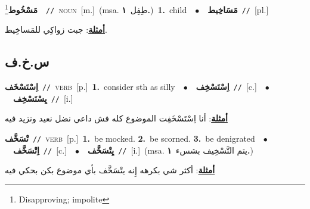 \documentclass[10pt,a4paper,twoside]{article} %
\begin{document}
\begin{multicols}{2}
{\setlength\topsep{0pt}\textbf{\foreignlanguage{arabic}{مَسْخُوط}}\footnote{Disapproving; impolite}\ \ {\color{gray}\texttt{//}\color{black}}\ \textsc{noun}\ [m.]\ \color{gray}(msa. \foreignlanguage{arabic}{طِفِل}~\foreignlanguage{arabic}{\textbf{١.}})\color{black}\ \textbf{1.}~child\ \ $\bullet$\ \ \setlength\topsep{0pt}\textbf{\foreignlanguage{arabic}{مَسَاخِيط}}\ {\color{gray}\texttt{//}\color{black}}\ [pl.]\  \begin{flushright}\color{gray}\foreignlanguage{arabic}{\textbf{\underline{\foreignlanguage{arabic}{أمثلة}}}: جبت زواكِي للمَساخِيط.}\end{flushright}\color{black}} \vspace{2mm}

\vspace{-3mm}
\subsection*{\color{blue}\foreignlanguage{arabic}{س.خ.ف}\color{blue}{}} 

{\setlength\topsep{0pt}\textbf{\foreignlanguage{arabic}{اِسْتَسْخَف}}\ {\color{gray}\texttt{//}\color{black}}\ \textsc{verb}\ [p.]\ \textbf{1.}~consider sth as silly\ \ $\bullet$\ \ \setlength\topsep{0pt}\textbf{\foreignlanguage{arabic}{اِسْتَسْخِف}}\ {\color{gray}\texttt{//}\color{black}}\ [c.]\ \ $\bullet$\ \ \setlength\topsep{0pt}\textbf{\foreignlanguage{arabic}{يِسْتَسْخِف}}\ {\color{gray}\texttt{//}\color{black}}\ [i.]\  \begin{flushright}\color{gray}\foreignlanguage{arabic}{\textbf{\underline{\foreignlanguage{arabic}{أمثلة}}}: أنا اِسْتَسْخَفِت الموضوع كله فش داعي نضل نعيد ونزيد فيه}\end{flushright}\color{black}} \vspace{2mm}

{\setlength\topsep{0pt}\textbf{\foreignlanguage{arabic}{تْسَخَّف}}\ {\color{gray}\texttt{//}\color{black}}\ \textsc{verb}\ [p.]\ \textbf{1.}~be mocked.  \textbf{2.}~be scorned.  \textbf{3.}~be denigrated\ \ $\bullet$\ \ \setlength\topsep{0pt}\textbf{\foreignlanguage{arabic}{اِتْسَخَّف}}\ {\color{gray}\texttt{//}\color{black}}\ [c.]\ \ $\bullet$\ \ \setlength\topsep{0pt}\textbf{\foreignlanguage{arabic}{يِتْسَخَّف}}\ {\color{gray}\texttt{//}\color{black}}\ [i.]\ \color{gray}(msa. \foreignlanguage{arabic}{يتم التَّسْخِيف بشسء}~\foreignlanguage{arabic}{\textbf{١.}})\color{black}\  \begin{flushright}\color{gray}\foreignlanguage{arabic}{\textbf{\underline{\foreignlanguage{arabic}{أمثلة}}}: أكثر شي بكرهه إِنه يتْسَخَّف بأي موضوع بكن بحكي فيه}\end{flushright}\color{black}} \vspace{2mm}


\end{multicols}
\end{document}
